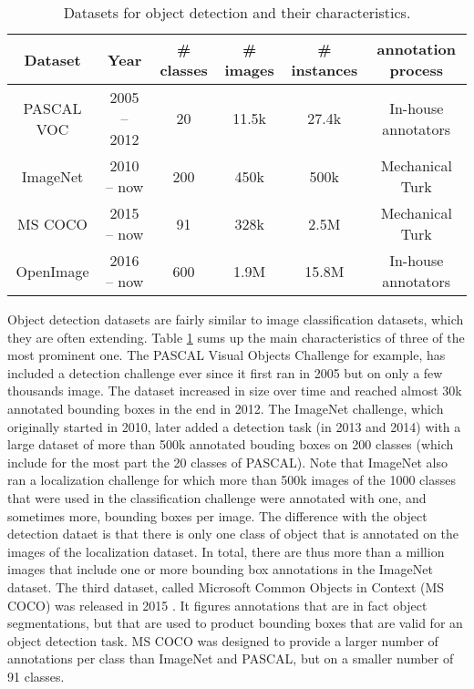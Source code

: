 \vspace{0.5cm}

\begin{table}
	\centering
	\caption{Datasets for object detection and their characteristics.}
	\begin{tabular}{|c|c|c|c|c|c|}
		\hline
		Dataset & Year & \# classes & \# images & \# instances & annotation process \\
		\hline
		PASCAL VOC \cite{Everingham10} & 2005 -- 2012 & 20 & 11.5k & 27.4k & In-house annotators \\
		ImageNet\cite{ILSVRC15} & 2010 -- now & 200 & 450k & 500k & Mechanical Turk \\
		MS COCO \cite{chen2015microsoft} & 2015 -- now & 91 & 328k & 2.5M & Mechanical Turk \\
		OpenImage \cite{OpenImages, OpenImages2} & 2016 -- now & 600 & 1.9M & 15.8M & In-house annotators \\
		\hline
	\end{tabular}
	\label{tab:detection_ds}
\end{table}
\vspace{0.5cm}

Object detection datasets are fairly similar to image classification datasets, which they are often extending. Table \ref{tab:detection_ds} sums up the main characteristics of three of the most prominent one. The PASCAL Visual Objects Challenge \cite{Everingham10} for example, has included a detection challenge ever since it first ran in 2005 but on only a few thousands image. The dataset increased in size over time and reached almost 30k annotated bounding boxes in the end in 2012. The ImageNet challenge, which originally started in 2010, later added a detection task (in 2013 and 2014) with a large dataset of more than 500k annotated bouding boxes on 200 classes (which include for the most part the 20 classes of PASCAL). Note that ImageNet also ran a localization challenge for which more than 500k images of the 1000 classes that were used in the classification challenge were annotated with one, and sometimes more, bounding boxes per image. The difference with the object detection dataet is that there is only one class of object that is annotated on the images of the localization dataset. In total, there are thus more than a million images that include one or more bounding box annotations in the ImageNet dataset. The third dataset, called Microsoft Common Objects in Context (MS COCO) was released in 2015 \cite{chen2015microsoft}. It figures annotations that are in fact object segmentations, but that are used to product bounding boxes that are valid for an object detection task. MS COCO was designed to provide a larger number of annotations per class than ImageNet and PASCAL, but on a smaller number of 91 classes. 

